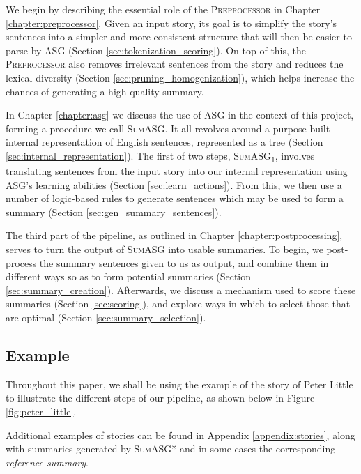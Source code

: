 We begin by describing the essential role of the \textsc{Preprocessor} in Chapter \ref{chapter:preprocessor}. Given an input story, its goal is to simplify the story's sentences into a simpler and more consistent structure that will then be easier to parse by ASG (Section \ref{sec:tokenization_scoring}). On top of this, the \textsc{Preprocessor} also removes irrelevant sentences from the story and reduces the lexical diversity (Section \ref{sec:pruning_homogenization}), which helps increase the chances of generating a high-quality summary.

In Chapter \ref{chapter:asg} we discuss the use of ASG in the context of this project, forming a procedure we call \textsc{SumASG}. It all revolves around a purpose-built internal representation of English sentences, represented as a tree (Section \ref{sec:internal_representation}). The first of two steps, \textsc{SumASG\textsubscript{1}}, involves translating sentences from the input story into our internal representation using ASG's learning abilities (Section \ref{sec:learn_actions}). From this, we then use a number of logic-based rules to generate sentences which may be used to form a summary (Section \ref{sec:gen_summary_sentences}).

The third part of the pipeline, as outlined in Chapter \ref{chapter:postprocessing}, serves to turn the output of \textsc{SumASG} into usable summaries. To begin, we post-process the summary sentences given to us as output, and combine them in different ways so as to form potential summaries (Section \ref{sec:summary_creation}). Afterwards, we discuss a mechanism used to score these summaries (Section \ref{sec:scoring}), and explore ways in which to select those that are optimal (Section \ref{sec:summary_selection}).

\subsection{Example}

Throughout this paper, we shall be using the example of the story of Peter Little to illustrate the different steps of our pipeline, as shown below in Figure \ref{fig:peter_little}.

Additional examples of stories can be found in Appendix \ref{appendix:stories}, along with summaries generated by \textsc{SumASG*} and in some cases the corresponding \textit{reference summary}.


